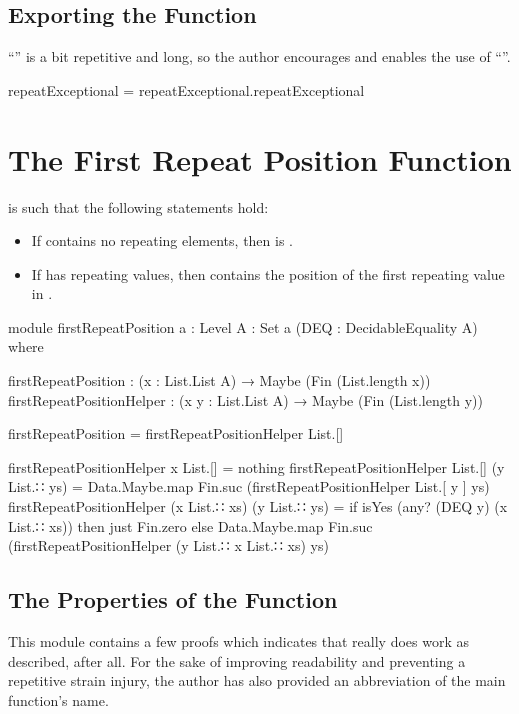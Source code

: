 \documentclass{report}
\begin{document}
\subsection{Exporting the Function}
``'' is a bit repetitive and long, so the author encourages and enables the use of ``''.

\begin{code}
repeatExceptional = repeatExceptional.repeatExceptional
\end{code}

\section{The First Repeat Position Function}
 is such that the following statements hold:

\begin{itemize}
  \item If  contains no repeating elements, then    is .
  \item If  has repeating values, then    contains the position of the first repeating value in .
\end{itemize}

\begin{code}
module firstRepeatPosition
  {a : Level}
  {A : Set a}
  (DEQ : DecidableEquality A) where

  firstRepeatPosition : (x : List.List A) → Maybe (Fin (List.length x))
  firstRepeatPositionHelper : (x y : List.List A) → Maybe (Fin (List.length y))

  firstRepeatPosition = firstRepeatPositionHelper List.[]

  firstRepeatPositionHelper x List.[] = nothing
  firstRepeatPositionHelper List.[] (y List.∷ ys) =
    Data.Maybe.map Fin.suc (firstRepeatPositionHelper List.[ y ] ys)
  firstRepeatPositionHelper (x List.∷ xs) (y List.∷ ys) =
    if isYes (any? (DEQ y) (x List.∷ xs))
      then just Fin.zero
      else Data.Maybe.map Fin.suc (firstRepeatPositionHelper (y List.∷ x List.∷ xs) ys)
\end{code}

\subsection{The Properties of the Function}
This module contains a few proofs which indicates that  really does work as described, after all.  For the sake of improving readability and preventing a repetitive strain injury, the author has also provided an abbreviation of the main function's name.
\end{document}

